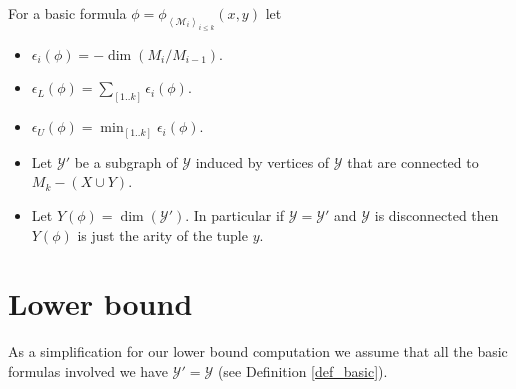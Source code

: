 \documentclass{amsart}
\newcommand{\M}{\mathcal M}
\newcommand{\Y}{\mathcal Y}
\newcommand{\paren}[1]{\left(#1\right)}
\newcommand{\agl}[1]{\left\langle #1 \right\rangle}
\begin{document}

\begin{Definition} \label{def_basic}
	For a basic formula $\phi = \phi_{\agl{\M_i}_{i \leq k}}(x, y)$ let
	\begin{itemize}
		\item $\epsilon_i(\phi) = -\dim \paren{M_i/M_{i-1}}$.
		\item $\epsilon_L(\phi) = \sum_{[1..k]} \epsilon_i(\phi)$.
		\item $\epsilon_U(\phi) = \min_{[1..k]} \epsilon_i(\phi)$.
		\item Let $\Y'$ be a subgraph of $\Y$ induced by vertices of $\Y$ that are connected to $M_k - (X \cup Y)$.
		\item Let $Y(\phi) = \dim (\Y')$.
		In particular if $\Y = \Y'$ and $\Y$ is disconnected then $Y(\phi)$ is just the arity of the tuple $y$.
	\end{itemize}
\end{Definition}


\section{Lower bound}

As a simplification for our lower bound computation we assume that all the basic formulas involved we have $\Y' = \Y$ (see Definition \ref{def_basic}).
\end{document}
